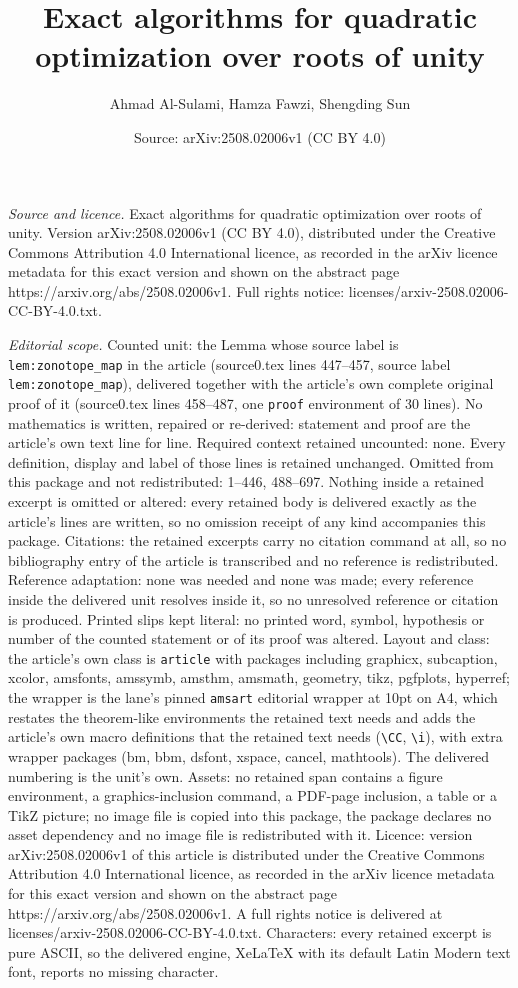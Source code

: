 \documentclass[10pt,a4paper]{amsart}
\title[Exact algorithms for quadratic optimization over roots of un]{Exact algorithms for quadratic optimization over roots of unity}
\author{Ahmad Al-Sulami, Hamza Fawzi, Shengding Sun}
\date{Source: arXiv:2508.02006v1 (CC BY 4.0)}
\begin{document}
\maketitle

\noindent\emph{Source and licence.} Exact algorithms for quadratic optimization over roots of unity. Version arXiv:2508.02006v1 (CC BY 4.0), distributed under the Creative Commons Attribution 4.0 International licence, as recorded in the arXiv licence metadata for this exact version and shown on the abstract page https://arxiv.org/abs/2508.02006v1. Full rights notice: licenses/arxiv-2508.02006-CC-BY-4.0.txt.\par\smallskip

\noindent\textit{Editorial scope.} Counted unit: the Lemma whose source label is \texttt{lem:zonotope\_map} in the article (source0.tex lines 447--457, source label \texttt{lem:zonotope\_map}), delivered together with the article's own complete original proof of it (source0.tex lines 458--487, one \texttt{proof} environment of 30 lines). No mathematics is written, repaired or re-derived: statement and proof are the article's own text line for line. Required context retained uncounted: none. Every definition, display and label of those lines is retained unchanged. Omitted from this package and not redistributed: 1--446, 488--697. Nothing inside a retained excerpt is omitted or altered: every retained body is delivered exactly as the article's lines are written, so no omission receipt of any kind accompanies this package. Citations: the retained excerpts carry no citation command at all, so no bibliography entry of the article is transcribed and no reference is redistributed. Reference adaptation: none was needed and none was made; every reference inside the delivered unit resolves inside it, so no unresolved reference or citation is produced. Printed slips kept literal: no printed word, symbol, hypothesis or number of the counted statement or of its proof was altered. Layout and class: the article's own class is \texttt{article} with packages including graphicx, subcaption, xcolor, amsfonts, amssymb, amsthm, amsmath, geometry, tikz, pgfplots, hyperref; the wrapper is the lane's pinned \texttt{amsart} editorial wrapper at 10pt on A4, which restates the theorem-like environments the retained text needs and adds the article's own macro definitions that the retained text needs (\texttt{\textbackslash CC}, \texttt{\textbackslash i}), with extra wrapper packages (bm, bbm, dsfont, xspace, cancel, mathtools). The delivered numbering is the unit's own. Assets: no retained span contains a figure environment, a graphics-inclusion command, a PDF-page inclusion, a table or a TikZ picture; no image file is copied into this package, the package declares no asset dependency and no image file is redistributed with it. Licence: version arXiv:2508.02006v1 of this article is distributed under the Creative Commons Attribution 4.0 International licence, as recorded in the arXiv licence metadata for this exact version and shown on the abstract page https://arxiv.org/abs/2508.02006v1. A full rights notice is delivered at licenses/arxiv-2508.02006-CC-BY-4.0.txt. Characters: every retained excerpt is pure ASCII, so the delivered engine, XeLaTeX with its default Latin Modern text font, reports no missing character.
\end{document}
